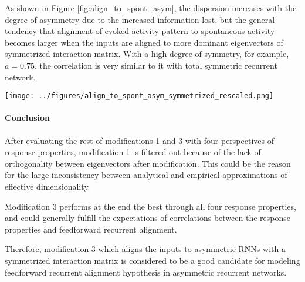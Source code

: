\documentclass[11pt]{article}
\begin{document}
	As shown in Figure \ref{fig:align_to_spont_asym}, the dispersion increases with the degree of asymmetry due to the increased information lost, but the general tendency that alignment of evoked activity pattern to spontaneous activity becomes larger when the inputs are aligned to more dominant eigenvectors of symmetrized interaction matrix. With a high degree of symmetry, for example, $a = 0.75$, the correlation is very similar to it with total symmetric recurrent network.
	
	\begin{SCfigure}[0.9][h] 
		\centering
		\caption[The correlation between alignment to spontaneous activity and feedforward recurrent alignment for asymmetric RNNs with symmetrized interactions considering influence from the degree of symmetry]{\textbf{The correlation between alignment to spontaneous activity and feedforward recurrent alignment for asymmetric RNNs with symmetrized interactions considering influence from the degree of symmetry.} As a control group,a fully symmetric RNN ($a=1.0$) is represented with dark green dots. For different degrees of symmetry from $a = 0.75$ to $0$, the darker the dots' color, the more asymmetry is in the network. Only modification 3 is evaluated for alignment to spontaneous activity.}
		\texttt{[image: ../figures/align\_to\_spont\_asym\_symmetrized\_rescaled.png]}
		\label{fig:align_to_spont_asym}
	\end{SCfigure}

	\vspace{0.5cm}
	\paragraph{Conclusion}
	After evaluating the rest of modifications 1 and 3 with four perspectives of response properties, modification 1 is filtered out because of the lack of orthogonality between eigenvectors after modification. This could be the reason for the large inconsistency between analytical and empirical approximations of effective dimensionality.
	
	Modification 3 performs at the end the best through all four response properties, and could generally fulfill the expectations of correlations between the response properties and feedforward recurrent alignment. 
	
	Therefore, modification 3 which aligns the inputs to asymmetric RNNs with a symmetrized interaction matrix is considered to be a good candidate for modeling feedforward recurrent alignment hypothesis in asymmetric recurrent networks.
	
\end{document}
